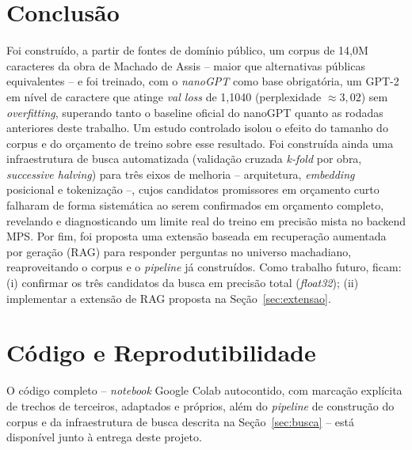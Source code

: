 \documentclass[conference]{IEEEtran}
\begin{document}
\section{Conclusão}

Foi construído, a partir de fontes de domínio público, um corpus de 14,0M
caracteres da obra de Machado de Assis -- maior que alternativas públicas
equivalentes -- e foi treinado, com o \textit{nanoGPT} como base obrigatória,
um GPT-2 em nível de caractere que atinge \textit{val loss} de 1,1040
(perplexidade $\approx 3{,}02$) sem \textit{overfitting}, superando tanto o
baseline oficial do nanoGPT quanto as rodadas anteriores deste trabalho. Um
estudo controlado isolou o efeito do tamanho do corpus e do orçamento de
treino sobre esse resultado. Foi construída ainda uma infraestrutura de busca
automatizada (validação cruzada \textit{k-fold} por obra, \textit{successive
halving}) para três eixos de melhoria -- arquitetura, \textit{embedding}
posicional e tokenização --, cujos candidatos promissores em orçamento curto
falharam de forma sistemática ao serem confirmados em orçamento completo,
revelando e diagnosticando um limite real do treino em precisão mista no
backend MPS. Por fim, foi proposta uma extensão baseada em recuperação
aumentada por geração (RAG) para responder perguntas no universo machadiano,
reaproveitando o corpus e o \textit{pipeline} já construídos. Como trabalho
futuro, ficam: (i) confirmar os três candidatos da busca em precisão total
(\textit{float32}); (ii) implementar a extensão de RAG proposta na
Seção~\ref{sec:extensao}.

\section*{Código e Reprodutibilidade}

O código completo -- \textit{notebook} Google Colab autocontido, com
marcação explícita de trechos de terceiros, adaptados e próprios, além do
\textit{pipeline} de construção do corpus e da infraestrutura de busca
descrita na Seção~\ref{sec:busca} -- está disponível junto à entrega deste
projeto.



\end{document}
